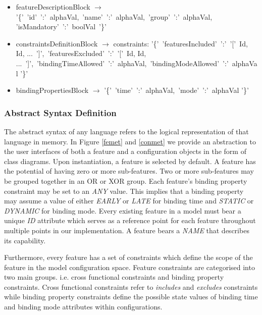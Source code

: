 \documentclass[conference]{IEEEtran}
\begin{document}
\begin{itemize}
	\item[] featureDescriptionBlock $\longrightarrow$ '\{'\ 'id'\ ':'\ alphaVal,\ 'name'\ ':'\ alphaVal,\ 'group'\ ':'\ alphaVal, 'isMandatory'\ ':'\ boolVal\ '\}' \\
	
	\item[] constraintsDefinitionBlock $\longrightarrow$ constraints: '\{'\ 'featuresIncluded'\ ':'\ '['\ Id, Id, ...\ ']',\ 'featuresExcluded'\ ':'\ '['\ Id, Id, ...\ ']',\ 'bindingTimeAllowed'\ ':'\ alphaVal,\ 'bindingModeAllowed'\ ':'\ alphaVal '\}'\\
	
	\item[] bindingPropertiesBlock $\longrightarrow$ '\{'\ 'time'\ ':'\ alphaVal,\ 'mode'\ ':'\ alphaVal '\}'\\
\end{itemize}

\subsubsection{Abstract Syntax Definition}
The abstract syntax of any language refers to the logical representation of that language in memory. In Figure \ref{femet} and \ref{conmet} we provide an abstraction to the user interfaces of both a feature and a configuration objects in the form of class diagrams. Upon instantiation, a feature is selected by default. A feature has the potential of having zero or more sub-features. Two or more sub-features may be grouped together in an OR or XOR group. Each feature's binding property constraint may be set to an \textit{ANY} value. This implies that a binding property may assume a value of either \textit{EARLY} or \textit{LATE} for binding time and \textit{STATIC} or \textit{DYNAMIC} for binding mode. Every existing feature in a model must bear a unique \textit{ID} attribute which serves as a reference point for each feature throughout multiple points in our implementation. A feature bears a \textit{NAME} that describes its capability. 

Furthermore, every feature has a set of constraints which define the scope of the feature in the model configuration space. Feature constraints are categorised into two main groups. i.e. cross functional constraints and binding property constraints.  Cross functional constraints refer to \textit{includes} and \textit{excludes} constraints while binding property constraints define the possible state values of binding time and binding mode attributes within configurations.
\end{document}
